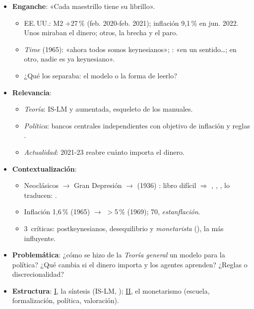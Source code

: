 \documentclass{article}
\begin{document}
\cabecerarepaso
\begin{columnas}

\begin{itemize}
\item \textbf{Enganche}: «Cada maestrillo tiene su librillo».
  \begin{itemize}
  \item EE.\,UU.: M2 +27\,\% (feb. 2020-feb. 2021); inflación 9,1\,\% en jun. 2022. Unos miraban el dinero; otros, la brecha y el paro.
  \item \emph{Time} (1965): «ahora todos somos keynesianos»; : «en un sentido\ldots; en otro, nadie es ya keynesiano».
  \item ¿Qué los separaba: el modelo o la forma de leerlo?
  \end{itemize}
\item \textbf{Relevancia}:
  \begin{itemize}
  \item \emph{Teoría}: IS-LM y  aumentada, esqueleto de los manuales.
  \item \emph{Política}: bancos centrales independientes con objetivo de inflación y reglas .
  \item \emph{Actualidad}: 2021-23 reabre cuánto importa el dinero.
  \end{itemize}
\item \textbf{Contextualización}:
  \begin{itemize}
  \item Neoclásicos  $\to$ Gran Depresión $\to$  (1936) : libro difícil $\Rightarrow$ , , ,  lo traducen: .
  \item Inflación 1,6\,\% (1965) $\to$ $>$5\,\% (1969); 70, \emph{estanflación}.
  \item 3~críticas: postkeynesianos, desequilibrio y \emph{monetarista} (), la más influyente.
  \end{itemize}
\item \textbf{Problemática}: ¿cómo se hizo de la \emph{Teoría general} un modelo para la política? ¿Qué cambia si el dinero importa y los agentes aprenden? ¿Reglas o discrecionalidad?
\item \textbf{Estructura}: \hyperref[rep:I]{I}, la síntesis (IS-LM, ); \hyperref[rep:II]{II}, el monetarismo (escuela, formalización, política, valoración).
\end{itemize}


\end{columnas}
\end{document}
